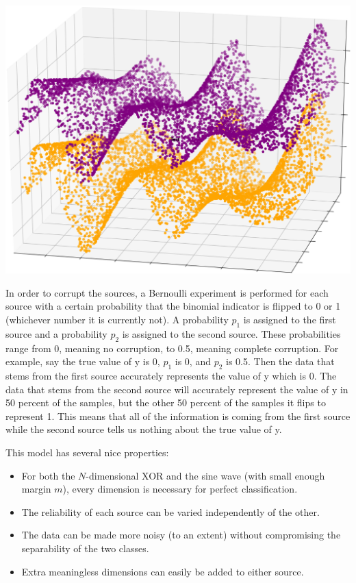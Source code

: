 \documentclass{article}
\begin{document}
\begin{minipage}{\textwidth}
\begin{minipage}{.48\textwidth}
    \includegraphics[width=\textwidth]{sine_wave_square.png}
    \label{fig:sine_wave}
\end{minipage}
\end{minipage}

In order to corrupt the sources, a Bernoulli experiment is performed for each source with a certain probability that the binomial indicator is flipped to 0 or 1 (whichever number it is currently not). A probability $p_1$ is assigned to the first source and a probability $p_2$ is assigned to the second source.  These probabilities range from 0, meaning no corruption, to 0.5, meaning complete corruption. For example, say the true value of y is 0, $p_1$ is 0, and $p_2$ is 0.5. Then the data that stems from the first source accurately represents the value of y which is 0. The data that stems from the second source will accurately represent the value of y in 50 percent of the samples, but the other 50 percent of the samples it flips to represent 1. This means that all of the information is coming from the first source while the second source tells us nothing about the true value of y.

This model has several nice properties:
\begin{itemize}
    \item For both the $N$-dimensional XOR and the sine wave (with small enough
        margin $m$), every dimension is necessary for perfect classification.
    \item The reliability of each source can be varied independently of the
        other.
    \item The data can be made more noisy (to an extent) without
        compromising the separability of the two classes.
    \item Extra meaningless dimensions can easily be added to either source.
\end{itemize}
\end{document}
